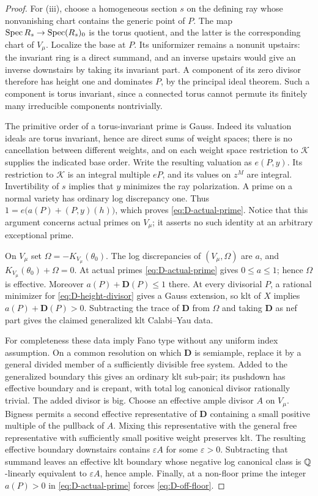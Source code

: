 \begin{proof}
For (iii), choose a homogeneous section $s$ on the defining ray whose
nonvanishing chart contains the generic point of $P$.  The map
$\operatorname{Spec} R_s\to\operatorname{Spec}(R_s)_0$ is the torus quotient, and the latter is the
corresponding chart of $V_\mu$.  Localize the base at $P$.  Its uniformizer
remains a nonunit upstairs: the invariant ring is a direct summand, and
an inverse upstairs would give an inverse downstairs by taking its
invariant part.  A component of its zero divisor therefore has height
one and dominates $P$, by the principal ideal theorem.  Such a component
is torus invariant, since a connected torus cannot permute its finitely
many irreducible components nontrivially.

The primitive order of a torus-invariant prime is Gauss.  Indeed its
valuation ideals are torus invariant, hence are direct sums of weight
spaces; there is no cancellation between different weights, and on each
weight space restriction to $\mathcal K$ supplies the indicated base
order.  Write the resulting valuation as $e(P,y)$.  Its restriction to
$\mathcal K$ is an integral multiple $eP$, and its values on $z^M$ are
integral.  Invertibility of $s$ implies that $y$ minimizes the ray
polarization.  A prime on a normal variety has ordinary log discrepancy
one.  Thus
$1=e\bigl(a(P)+(P,y)(h)\bigr)$, which proves
\eqref{eq:D-actual-prime}.  Notice that this argument concerns actual
primes on $V_\mu$; it asserts no such identity at an arbitrary exceptional
prime.

On $V_\mu$ set $\Omega=-K_{V_\mu}(\theta_0)$.  The log discrepancies of
$(V_\mu,\Omega)$ are $a$, and $K_{V_\mu}(\theta_0)+\Omega=0$.
At actual primes \eqref{eq:D-actual-prime} gives $0\le a\le1$; hence
$\Omega$ is effective.  Moreover
$a(P)+\mathbf D(P)\le1$ there.  At every divisorial $P$, a rational
minimizer for \eqref{eq:D-height-divisor} gives a Gauss extension, so klt
of $X$ implies $a(P)+\mathbf D(P)>0$.  Subtracting the trace of
$\mathbf D$ from $\Omega$ and taking $\mathbf D$ as nef part gives the
claimed generalized klt Calabi--Yau data.

For completeness these data imply Fano type without any uniform index
assumption.  On a common resolution on which $\mathbf D$ is semiample,
replace it by a general divided member of a sufficiently divisible free
system.  Added to the generalized boundary this gives an ordinary klt
sub-pair; its pushdown has effective boundary and is crepant, with total log
canonical divisor rationally trivial.  The added divisor is big.
Choose an effective ample divisor $A$ on $V_\mu$.  Bigness permits a second
effective representative of $\mathbf D$ containing a small positive
multiple of the pullback of $A$.  Mixing this representative with the
general free representative with sufficiently small positive weight
preserves klt.  The resulting effective boundary downstairs contains
$\varepsilon A$ for some $\varepsilon>0$.  Subtracting that summand leaves
an effective klt boundary whose negative log canonical class is
$\mathbb Q$-linearly equivalent to $\varepsilon A$, hence ample.  Finally, at
a non-floor prime the integer $a(P)>0$ in
\eqref{eq:D-actual-prime} forces \eqref{eq:D-off-floor}.
\end{proof}

